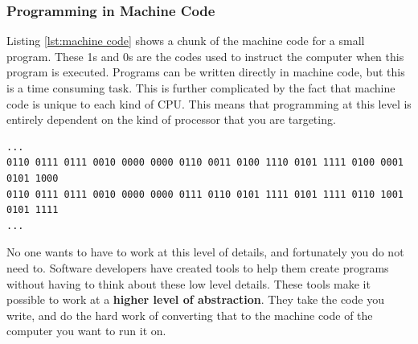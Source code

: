 
\clearpage

\subsubsection{Programming in Machine Code} %
\label{ssub:programming_in_machine_code}

Listing \ref{lst:machine code} shows a chunk of the machine code for a small program. These 1s and 0s are the codes used to instruct the computer when this program is executed. Programs can be written directly in machine code, but this is a time consuming task. This is further complicated by the fact that machine code is unique to each kind of CPU. This means that programming at this level is entirely dependent on the kind of processor that you are targeting.

\begin{lstlisting}[caption={128 bits from the 106,752 bits of Machine Code from a small program.},label={lst:machine code}]
...
0110 0111 0111 0010 0000 0000 0110 0011 0100 1110 0101 1111 0100 0001 0101 1000
0110 0111 0111 0010 0000 0000 0111 0110 0101 1111 0101 1111 0110 1001 0101 1111
...
\end{lstlisting}

No one wants to have to work at this level of details, and fortunately you do not need to. Software developers have created tools to help them create programs without having to think about these low level details. These tools make it possible to work at a \textbf{higher level of abstraction}. They take the code you write, and do the hard work of converting that to the machine code of the computer you want to run it on.


